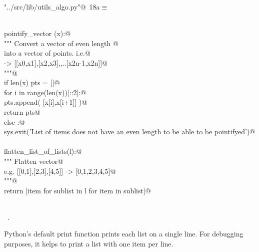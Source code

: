 \documentclass[11.5pt]{report}
\begin{document}
\begin{flushleft} \small\label{scrap8}\raggedright\small
{} \verb@"../src/lib/utils_algo.py"@\nobreak\ {\footnotesize {18a}}$\equiv$
\vspace{-1ex}
\begin{list}{}{} \item
\mbox{}\verb@@\\
\mbox{}\verb@def pointify_vector (x):@\\
\mbox{}\verb@    """ Convert a vector of even length @\\
\mbox{}\verb@    into a vector of points. i.e.@\\
\mbox{}\verb@    [x0,x1,x2,...x2n] -> [[x0,x1],[x2,x3],,..[x2n-1,x2n]]@\\
\mbox{}\verb@    """@\\
\mbox{}\verb@    if len(x) % 2 == 0:@\\
\mbox{}\verb@        pts = []@\\
\mbox{}\verb@        for i in range(len(x))[::2]:@\\
\mbox{}\verb@            pts.append( [x[i],x[i+1]] )@\\
\mbox{}\verb@        return pts@\\
\mbox{}\verb@    else :@\\
\mbox{}\verb@        sys.exit('List of items does not have an even length to be able to be pointifyed')@\\
\mbox{}\verb@@\\
\mbox{}\verb@def flatten_list_of_lists(l):@\\
\mbox{}\verb@    """ Flatten vector@\\
\mbox{}\verb@      e.g.  [[0,1],[2,3],[4,5]] -> [0,1,2,3,4,5]@\\
\mbox{}\verb@    """@\\
\mbox{}\verb@    return [item for sublist in l for item in sublist]@\\
\mbox{}\verb@@\\
\mbox{}\verb@@{\NWsep}
\end{list}
\vspace{-1.5ex}
\footnotesize
\begin{list}{}{\setlength{\itemsep}{-\parsep}\setlength{\itemindent}{-\leftmargin}}
\item \NWtxtFileDefBy\ .

\item{}
\end{list}
\vspace{4ex}
\end{flushleft}
\newchunk Python's default print function prints each list on a single line. For 
debugging purposes,  it helps to print a list with one item per line. 
\end{document}
